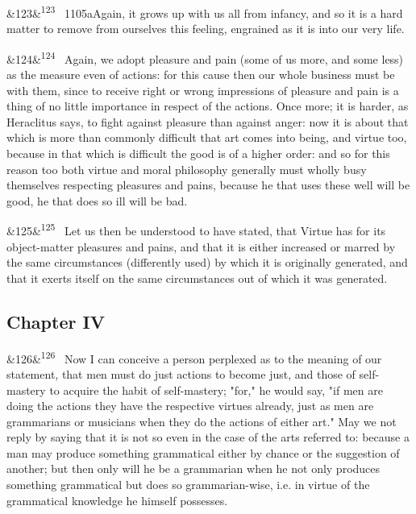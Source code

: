 \documentclass[12pt]{article}
\newcommand{\para}[1][]{\par\noindent\ifx&#1&\else\textsuperscript{\footnotesize #1}~\fi}
\begin{document}
\para[123] 1105aAgain, it grows up with us all from infancy, and so it is a hard matter to remove from ourselves this feeling, engrained as it is into our very life.

\para[124] Again, we adopt pleasure and pain (some of us more, and some less) as the measure even of actions: for this cause then our whole business must be with them, since to receive right or wrong impressions of pleasure and pain is a thing of no little importance in respect of the actions. Once more; it is harder, as Heraclitus says, to fight against pleasure than against anger: now it is about that which is more than commonly difficult that art comes into being, and virtue too, because in that which is difficult the good is of a higher order: and so for this reason too both virtue and moral philosophy generally must wholly busy themselves respecting pleasures and pains, because he that uses these well will be good, he that does so ill will be bad.

\para[125] Let us then be understood to have stated, that Virtue has for its object-matter pleasures and pains, and that it is either increased or marred by the same circumstances (differently used) by which it is originally generated, and that it exerts itself on the same circumstances out of which it was generated.

\subsection*{Chapter IV}

\para[126] Now I can conceive a person perplexed as to the meaning of our statement, that men must do just actions to become just, and those of self-mastery to acquire the habit of self-mastery; "for," he would say, "if men are doing the actions they have the respective virtues already, just as men are grammarians or musicians when they do the actions of either art." May we not reply by saying that it is not so even in the case of the arts referred to: because a man may produce something grammatical either by chance or the suggestion of another; but then only will he be a grammarian when he not only produces something grammatical but does so grammarian-wise, i.e. in virtue of the grammatical knowledge he himself possesses.
\end{document}
